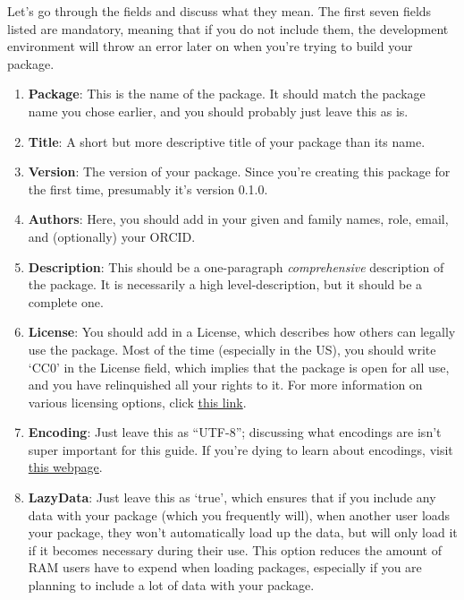 \documentclass[
]{book}
\begin{document}
Let's go through the fields and discuss what they mean. The first seven fields listed are mandatory, meaning that if you do not include them, the development environment will throw an error later on when you're trying to build your package.

\begin{enumerate}
\def\labelenumi{\arabic{enumi}.}
\item
  \textbf{Package}: This is the name of the package. It should match the package name you chose earlier, and you should probably just leave this as is.
\item
  \textbf{Title}: A short but more descriptive title of your package than its name.
\item
  \textbf{Version}: The version of your package. Since you're creating this package for the first time, presumably it's version 0.1.0.
\item
  \textbf{Authors}: Here, you should add in your given and family names, role, email, and (optionally) your ORCID.
\item
  \textbf{Description}: This should be a one-paragraph \emph{comprehensive} description of the package. It is necessarily a high level-description, but it should be a complete one.
\item
  \textbf{License}: You should add in a License, which describes how others can legally use the package. Most of the time (especially in the US), you should write `CC0' in the License field, which implies that the package is open for all use, and you have relinquished all your rights to it. For more information on various licensing options, click \href{https://cran.r-project.org/doc/manuals/r-release/R-exts.html\#Licensing}{this link}.
\item
  \textbf{Encoding}: Just leave this as ``UTF-8''; discussing what encodings are isn't super important for this guide. If you're dying to learn about encodings, visit \href{https://www.w3.org/International/questions/qa-what-is-encoding}{this webpage}.
\item
  \textbf{LazyData}: Just leave this as `true', which ensures that if you include any data with your package (which you frequently will), when another user loads your package, they won't automatically load up the data, but will only load it if it becomes necessary during their use. This option reduces the amount of RAM users have to expend when loading packages, especially if you are planning to include a lot of data with your package.
\end{enumerate}
\end{document}

